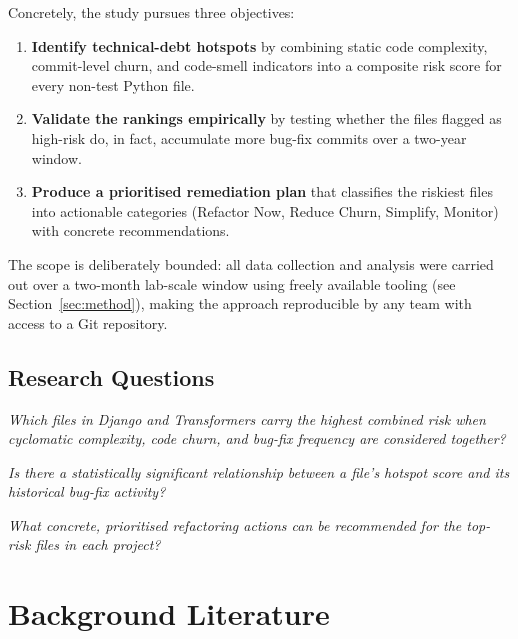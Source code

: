 \documentclass[12pt,a4paper]{article}
\begin{document}
Concretely, the study pursues three objectives:

\begin{enumerate}[leftmargin=2em]
  \item \textbf{Identify technical-debt hotspots} by combining static code complexity, commit-level churn, and code-smell indicators into a composite risk score for every non-test Python file.
  \item \textbf{Validate the rankings empirically} by testing whether the files flagged as high-risk do, in fact, accumulate more bug-fix commits over a two-year window.
  \item \textbf{Produce a prioritised remediation plan} that classifies the riskiest files into actionable categories (Refactor Now, Reduce Churn, Simplify, Monitor) with concrete recommendations.
\end{enumerate}

The scope is deliberately bounded: all data collection and analysis were carried out over a two-month lab-scale window using freely available tooling (see Section~\ref{sec:method}), making the approach reproducible by any team with access to a Git repository.

\subsection{Research Questions}
\label{sec:rq}

\begin{description}[style=unboxed,leftmargin=1em]
  \item[\textbf{RQ\,1.}] \emph{Which files in Django and Transformers carry the highest combined risk when cyclomatic complexity, code churn, and bug-fix frequency are considered together?}
  \item[\textbf{RQ\,2.}] \emph{Is there a statistically significant relationship between a file's hotspot score and its historical bug-fix activity?}
  \item[\textbf{RQ\,3.}] \emph{What concrete, prioritised refactoring actions can be recommended for the top-risk files in each project?}
\end{description}

\section{Background Literature}
\label{sec:literature}
\end{document}

